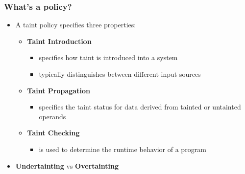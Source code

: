 \begin{frame}
	\frametitle{What's a policy?}
	\begin{itemize}
		\item A taint policy specifies three properties:
		\begin{itemize}
			\item \textbf{Taint Introduction}
			\begin{itemize}
				\item specifies how taint is introduced into a system
				\item typically distinguishes between different input sources
			\end{itemize}
			\item \textbf{Taint Propagation}
			\begin{itemize}
				\item specifies the taint status for data derived from tainted or untainted operands
			\end{itemize}
			\item \textbf{Taint Checking}
			\begin{itemize}
				\item is used to determine the runtime behavior of a program
			\end{itemize}
		\end{itemize}
		\item \textbf{Undertainting} vs \textbf{Overtainting}
	\end{itemize}
\end{frame}